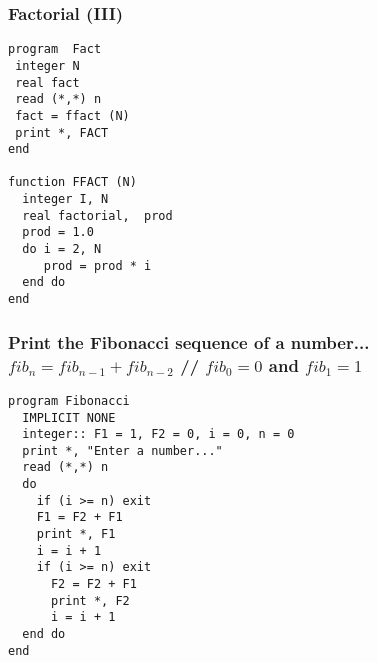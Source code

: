 \documentclass[xcolor=dvipsnames,dvip,notes=show,table]{beamer}
\begin{document}
\begin{frame}[fragile]
\frametitle{Factorial (III)}

\scriptsize
\begin{lstlisting}
program  Fact 
 integer N 
 real fact
 read (*,*) n 
 fact = ffact (N) 
 print *, FACT 
end

function FFACT (N) 
  integer I, N 
  real factorial,  prod
  prod = 1.0 
  do i = 2, N 
     prod = prod * i 
  end do 
end
\end{lstlisting}
\end{frame}



\begin{frame}[fragile]
\frametitle{Print the Fibonacci sequence of a number... $fib_n=fib_{n-1}+fib_{n-2}$ // $fib_0 = 0$ and $fib_1 = 1$}

\scriptsize
\begin{lstlisting}
program Fibonacci
  IMPLICIT NONE
  integer:: F1 = 1, F2 = 0, i = 0, n = 0
  print *, "Enter a number..."
  read (*,*) n
  do 
    if (i >= n) exit
    F1 = F2 + F1
    print *, F1
    i = i + 1
    if (i >= n) exit
      F2 = F2 + F1
      print *, F2
      i = i + 1
  end do
end
\end{lstlisting}
\end{frame}


\frame{
\titlepage

}


\end{document}
